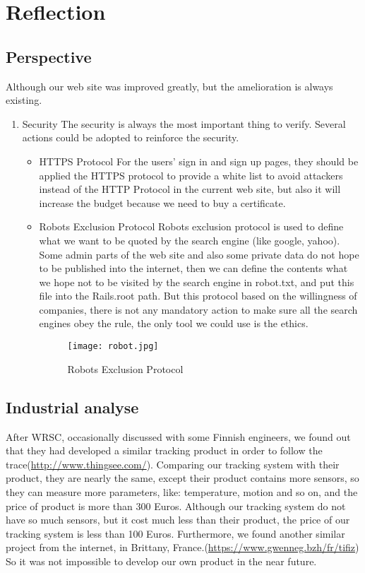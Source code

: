 \section{Reflection}
\subsection{Perspective}
Although our web site was improved greatly, but the amelioration is always existing.
\begin{enumerate}
\item{Security}
The security is always the most important thing to verify. Several actions could be adopted to reinforce the security.
\begin{itemize}
\item{HTTPS Protocol}
For the users' sign in and sign up pages, they should be applied the HTTPS protocol to provide a white list to avoid attackers instead of the HTTP Protocol in the current web site, but also it will increase the budget because we need to buy a certificate.
\item{Robots Exclusion Protocol}
Robots exclusion protocol is used to define what we want to be quoted by the search engine (like google, yahoo). Some admin parts of the web site and also some private data do not hope to be published into the internet, then we can define the contents what we hope not to be visited by the search engine in robot.txt, and put this file into the Rails.root path. But this protocol based on the willingness of companies, there is not any mandatory action to make sure all the search engines obey the rule, the only tool we could use is the ethics.
\begin{figure}[h!]
    \centering
    \texttt{[image: robot.jpg]}
    \caption{Robots Exclusion Protocol }
    \label{fig-sample}
\end{figure} 
\end{itemize} 
\end{enumerate}
\subsection{Industrial analyse}
After WRSC, occasionally discussed with some Finnish engineers, we found out that they had developed a similar tracking product in order to follow the trace(\url{http://www.thingsee.com/}). Comparing our tracking system with their product, they are nearly the same, except their product contains more sensors, so they can measure more parameters, like: temperature, motion and so on, and the price of product is more than 300 Euros. Although our tracking system do not have so much sensors, but it cost much less than their product, the price of our tracking system is less than 100 Euros.
Furthermore, we found another similar project from the internet, in Brittany, France.(\url{https://www.gwenneg.bzh/fr/tifiz}) So it was not impossible to develop our own product in the near future.
